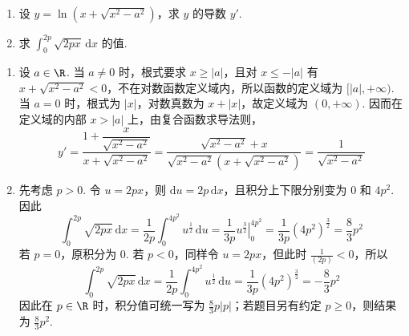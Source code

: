 \begin{problem}
\begin{enumerate}
\item 设 \( y=\ln\left( x+\sqrt{x^2-a^2} \right) \)，求 \( y \) 的导数 \( y' \).

\item 求 \( \int_0^{2p}\sqrt{2px}\,\mathrm{d}x \) 的值.
\end{enumerate}
\end{problem}

\begin{solution}
\begin{enumerate}
\item 设 \(a\in\R\). 当 \(a\ne0\) 时，根式要求 \(x\geq|a|\)，且对 \(x\leq-|a|\) 有
\(x+\sqrt{x^2-a^2}<0\)，不在对数函数定义域内，所以函数的定义域为 \([|a|,+\infty)\). 当 \(a=0\) 时，根式为 \(|x|\)，对数真数为 \(x+|x|\)，故定义域为 \((0,+\infty)\). 因而在定义域的内部 \(x>|a|\) 上，由复合函数求导法则，
\[
y'=\frac{1+\dfrac{x}{\sqrt{x^2-a^2}}}{x+\sqrt{x^2-a^2}}
=\frac{\sqrt{x^2-a^2}+x}{\sqrt{x^2-a^2}\left(x+\sqrt{x^2-a^2}\right)}
=\frac{1}{\sqrt{x^2-a^2}}
\]

\item 先考虑 \(p>0\). 令 \(u=2px\)，则 \(\mathrm{d}u=2p\,\mathrm{d}x\)，且积分上下限分别变为 \(0\) 和 \(4p^2\). 因此
\[
\int_0^{2p}\sqrt{2px}\,\mathrm{d}x
=\frac{1}{2p}\int_0^{4p^2}u^{\frac12}\,\mathrm{d}u
=\frac{1}{3p}\left.u^{\frac32}\right|_0^{4p^2}
=\frac{1}{3p}\left(4p^2\right)^{\frac32}
=\frac{8}{3}p^2
\]
若 \(p=0\)，原积分为 \(0\). 若 \(p<0\)，同样令 \(u=2px\)，但此时 \(\frac{1}{(2p)}<0\)，所以
\[
\int_0^{2p}\sqrt{2px}\,\mathrm{d}x
=\frac{1}{2p}\int_0^{4p^2}u^{\frac12}\,\mathrm{d}u
=\frac{1}{3p}\left(4p^2\right)^{\frac32}
=-\frac{8}{3}p^2
\]
因此在 \(p\in\R\) 时，积分值可统一写为 \(\frac83p\lvert p\rvert\)；若题目另有约定 \(p\geq0\)，则结果为 \(\frac83p^2\).
\end{enumerate}
\end{solution}
